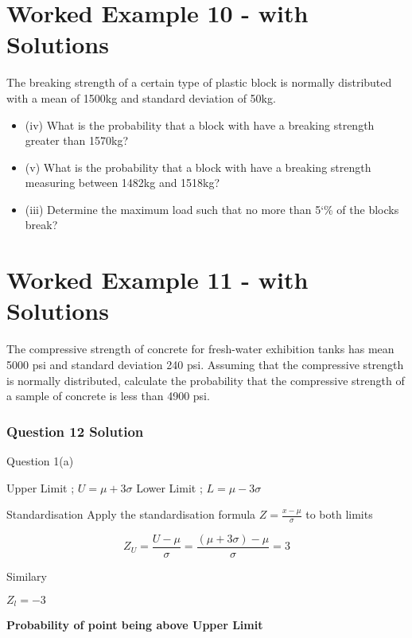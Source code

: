 \documentclass[]{report}
\begin{document}
\section{Worked Example 10 - with Solutions}

The breaking strength of a certain type of plastic block is normally distributed with a
mean of 1500kg and standard deviation of 50kg. 

\begin{itemize}
	\item (iv)	What is the probability that a block with have a breaking strength greater than 1570kg?
	\item (v)	What is the probability that a block with have a breaking strength measuring between 1482kg and 1518kg?
	\item (iii)	Determine the maximum load such that no more than 5`\% of the blocks break?
\end{itemize}

\section{Worked Example 11 - with Solutions}
The compressive strength of concrete for fresh-water exhibition tanks has mean 5000 psi and standard deviation 240 psi. Assuming that the compressive strength is normally distributed, calculate the probability that the compressive strength of a sample of concrete is less than 4900 psi.




	

\subsubsection{Question 12 Solution}

Question 1(a)

Upper Limit ;  $U = \mu + 3 \sigma $
Lower Limit ;  $L = \mu - 3 \sigma $

Standardisation
Apply the standardisation formula	$Z=\frac{x-\mu}{\sigma} $	to both limits

\[ Z_U = \frac{U-\mu}{\sigma} =  \frac{(\mu + 3 \sigma)-\mu}{\sigma} = 3\]

Similary

$Z_l=-3$ 

\noindent \textbf{Probability of point being above Upper Limit}
\end{document}
